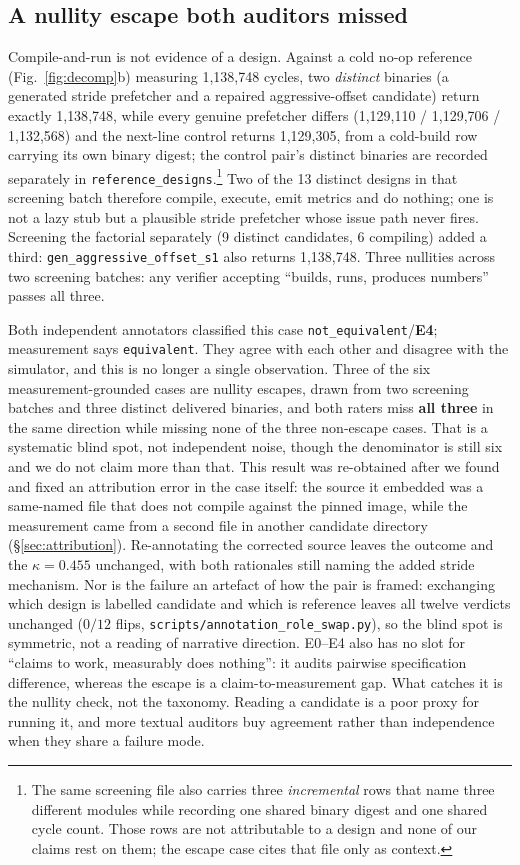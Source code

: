 \documentclass[10pt,twocolumn]{article}
\begin{document}
\subsection{A nullity escape both auditors missed}
\label{sec:escape}

Compile-and-run is not evidence of a design. Against a cold no-op reference
(Fig.~\ref{fig:decomp}b)
measuring 1{,}138{,}748 cycles, two \emph{distinct} binaries (a generated stride
prefetcher and a repaired aggressive-offset candidate) return exactly
1{,}138{,}748, while every genuine prefetcher differs (1{,}129{,}110 /
1{,}129{,}706 / 1{,}132{,}568) and the next-line control returns 1{,}129{,}305,
from a cold-build row carrying its own binary digest; the control pair's distinct
binaries are recorded separately in \texttt{reference\_designs}.\footnote{The same
screening file also carries three \emph{incremental} rows that name three different
modules while recording one shared binary digest and one shared cycle count. Those
rows are not attributable to a design and none of our claims rest on them; the
escape case cites that file only as context.}
Two of the 13 distinct designs in that screening batch therefore compile, execute,
emit metrics and do nothing; one is not a lazy stub but a plausible stride
prefetcher whose issue path never fires. Screening the factorial separately (9
distinct candidates, 6 compiling) added a third:
\texttt{gen\_aggressive\_offset\_s1} also returns 1{,}138{,}748. Three nullities
across two screening batches: any verifier accepting ``builds, runs, produces
numbers'' passes all three.

Both independent annotators classified this case
\texttt{not\_equivalent}/\textbf{E4}; measurement says \texttt{equivalent}. They
agree with each other and disagree with the simulator, and this is no longer a single
observation. Three of the six measurement-grounded cases are nullity escapes, drawn
from two screening batches and three distinct delivered binaries, and both raters miss
\textbf{all three} in the same direction while missing none of the three non-escape
cases. That is a systematic blind spot, not independent noise, though the
denominator is still six and we do not claim more than that. This
result was re-obtained after we found and fixed an attribution error in the case
itself: the source it embedded was a same-named file that does not compile against
the pinned image, while the measurement came from a second file in another candidate
directory (\S\ref{sec:attribution}). Re-annotating the corrected source leaves the
outcome and the $\kappa=0.455$ unchanged, with both rationales still naming the added
stride mechanism. Nor is the failure an artefact of how the pair is framed: exchanging
which design is labelled candidate and which is reference leaves all twelve verdicts
unchanged ($0/12$ flips, \texttt{scripts/annotation\_role\_swap.py}), so the blind spot is
symmetric, not a reading of narrative direction. E0--E4
also has no slot for ``claims to work, measurably does
nothing'': it audits pairwise specification difference, whereas the escape is a
claim-to-measurement gap. What catches it is the nullity check, not the taxonomy.
Reading a candidate is a poor proxy for running it, and more textual auditors buy
agreement rather than independence when they share a failure mode.
\end{document}
